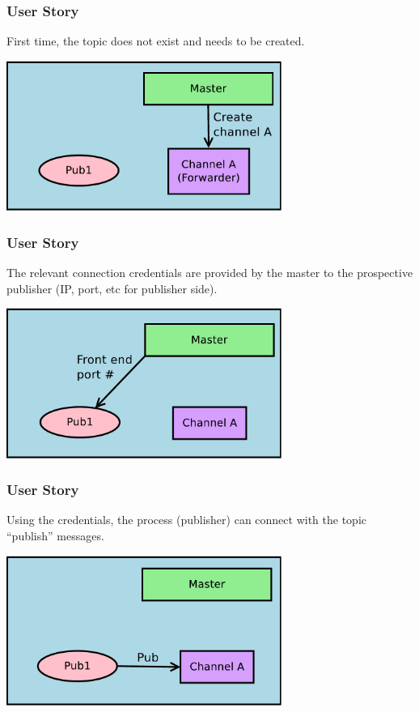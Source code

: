 \documentclass[xcolor=svgnames]{beamer}
\begin{document}
\begin{frame}[fragile]
  \frametitle{User Story}
First time, the topic does not exist and needs to be created.
\begin{center}
\includegraphics[width=9cm]{./Diagram2.pdf}
\end{center}
\end{frame}


\begin{frame}[fragile]
  \frametitle{User Story}
  
The relevant connection credentials are provided by the master to the 
prospective publisher (IP, port, etc for publisher side).
\begin{center}
\includegraphics[width=9cm]{./Diagram3.pdf}
\end{center}
\end{frame}


\begin{frame}[fragile]
  \frametitle{User Story}
Using the credentials, the process (publisher) can connect with the topic 
``publish'' messages.
\begin{center}
\includegraphics[width=9cm]{./Diagram4.pdf}
\end{center}
\end{frame}
\end{document}
